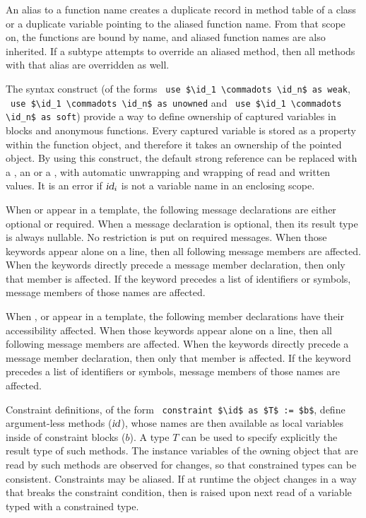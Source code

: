An alias to a function name creates a duplicate record in method table of a class or a duplicate variable pointing to the aliased function name. From that scope on, the functions are bound by name, and aliased function names are also inherited. If a subtype attempts to override an aliased method, then all methods with that alias are overridden as well. 

The  syntax construct (of the forms ~\lstinline{use $\id_1 \commadots \id_n$ as weak}, ~\lstinline{use $\id_1 \commadots \id_n$ as unowned} and ~\lstinline{use $\id_1 \commadots \id_n$ as soft}) provide a way to define ownership of captured variables in blocks and anonymous functions. Every captured variable is stored as a property within the function object, and therefore it takes an ownership of the pointed object. By using this construct, the default strong reference can be replaced with a , an  or a , with automatic unwrapping and wrapping of read and written values. It is an error if $\mbox{\sl id}_i$ is not a variable name in an enclosing scope. 

When  or  appear in a template, the following message declarations are either optional or required. When a message declaration is optional, then its result type is always nullable. No restriction is put on required messages. When those keywords appear alone on a line, then all following message members are affected. When the keywords directly precede a message member declaration, then only that member is affected. If the keyword precedes a list of identifiers or symbols, message members of those names are affected. 

When ,  or  appear in a template, the following member declarations have their accessibility affected. When those keywords appear alone on a line, then all following message members are affected. When the keywords directly precede a message member declaration, then only that member is affected. If the keyword precedes a list of identifiers or symbols, message members of those names are affected. 

Constraint definitions, of the form ~\lstinline!constraint $\id$ as $T$ := $b$!, define argument-less methods ($\mbox{\sl id}$), whose names are then available as local variables inside of constraint blocks ($b$). A type $T$ can be used to specify explicitly the result type of such methods. The instance variables of the owning object that are read by such methods are observed for changes, so that constrained types can be consistent. Constraints may be aliased. If at runtime the object changes in a way that breaks the constraint condition, then  is raised upon next read of a variable typed with a constrained type. 

